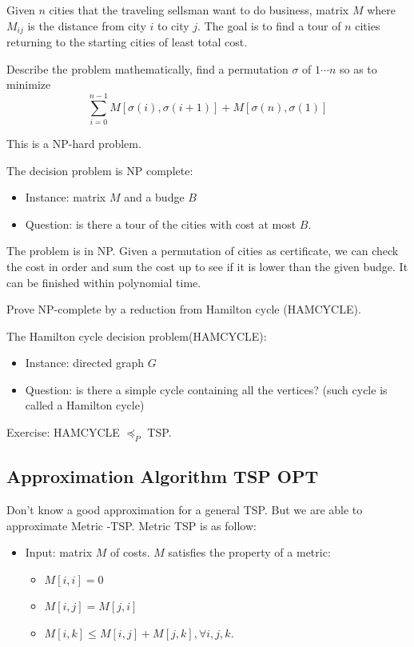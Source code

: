 Given $n$ cities that the traveling sellsman want to do business, matrix $M$ where $M_{ij}$ is the distance from city $i$ to city $j$. The goal is to find a tour of $n$ cities returning to the starting cities of least total cost.

Describe the problem mathematically, find a permutation $\sigma$ of $1 \cdots n$ so as to minimize \[\sum_{i=0}^{n-1} M[\sigma(i), \sigma(i+1)] + M[\sigma(n), \sigma(1)]\]

This is a NP-hard problem. 

The decision problem is NP complete:
\begin{itemize}
	\item Instance: matrix $M$ and a budge $B$
	\item Question: is there a tour of the cities with cost at most $B$.
\end{itemize}

The problem is in NP. Given a permutation of cities as certificate, we can check the cost in order and sum the cost up to see if it is lower than the given budge. It can be finished within polynomial time.

Prove NP-complete by a reduction from Hamilton cycle (HAMCYCLE).

The Hamilton cycle decision problem(HAMCYCLE):
\begin{itemize}
	\item Instance: directed graph $G$
	\item Question: is there a simple cycle containing all the vertices? (such cycle is called a Hamilton cycle)
\end{itemize}

Exercise: HAMCYCLE $\preccurlyeq_P$ TSP.

\subsection{Approximation Algorithm TSP OPT}
Don't know a good approximation for a general TSP.  But we are able to approximate Metric -TSP. Metric TSP is as follow:
\begin{itemize}
	\item Input: matrix $M$ of costs. $M$ satisfies the property of a metric:
	\begin{itemize}
		\item $M[i, i] = 0$
		\item $M[i, j] = M[j, i]$
		\item $M[i, k] \le M[i, j] + M[j, k], \forall i, j, k$.
	\end{itemize} 
\end{itemize}
 
